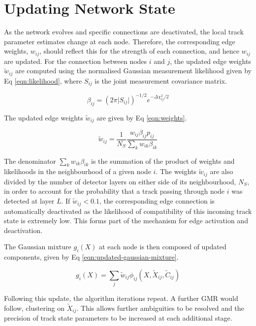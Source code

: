 \section{Updating Network State}
\label{gnn-updating-network-state}

As the network evolves and specific connections are deactivated, the local track parameter estimates change at each node. Therefore, the corresponding edge weights, $w_{ij}$, should reflect this for the strength of each connection, and hence $w_{ij}$ are updated. For the connection between nodes $i$ and $j$, the updated edge weights $\widetilde{w}_{ij}$ are computed using the normalised Gaussian measurement likelihood given by Eq \eqref{eqn:likelihood}, where $S_{ij}$ is the joint measurement covariance matrix.

\begin{equation}
\beta_{ij} = (2 \pi \lvert S_{ij} \rvert )^{-1/2}  e^{-\Delta \chi^{2}_{ij} / 2}
\label{eqn:likelihood}
\end{equation}


The updated edge weights $\widetilde{w}_{ij}$ are given by Eq \eqref{eqn:weights}. 

\begin{equation}
\widetilde{w}_{ij} = \frac{1}{N_S} \frac{w_{ij}\beta_{ij} p_{ij}}{\sum_{k}w_{ik}\beta_{ik}}
\label{eqn:weights}
\end{equation}


The denominator $\sum_{k}w_{ik}\beta_{ik}$ is the summation of the product of weights and likelihoods in the neighbourhood of a given node $i$. The weights $\widetilde{w}_{ij}$ are also divided by the number of detector layers on either side of its neighbourhood, $N_S$, in order to account for the probability that a track passing through node $i$ was detected at layer $L$. If $\widetilde{w}_{ij} < 0.1$, the corresponding edge connection is automatically deactivated as the likelihood of compatibility of this incoming track state is extremely low. This forms part of the mechanism for edge activation and deactivation.

The Gaussian mixture $g_i(X)$ at each node is then composed of updated components, given by Eq \eqref{eqn:updated-gaussian-mixture}.

\begin{equation}
g_i(X) = \sum_{j} \widetilde{w}_{ij}\phi_{ij}(X, \widetilde{X}_{ij}, \widetilde{C}_{ij})
\label{eqn:updated-gaussian-mixture}
\end{equation}

Following this update, the algorithm iterations repeat. A further GMR would follow, clustering on $\widetilde{X}_{ij}$. This allows further ambiguities to be resolved and the precision of track state parameters to be increased at each additional stage.






